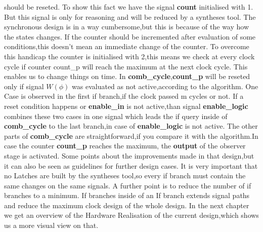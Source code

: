 should be reseted.
To show this fact we have the signal \textbf{count} initialised with 1. But this signal is only for reasoning and will be reduced by a syntheses tool.  
The synchronous design is in a way cumbersome,but this is because of the way how the states changes.
If the counter should be incremented after evaluation of some conditions,this doesn't mean an immediate change of the counter.
To overcome this handicap the counter is initialised with 2,this means we check at every clock cycle if counter count\_p will reach the maximum
at the next clock cycle. This enables us to change things on time. 
In \textbf{comb\_cycle},\textbf{count\_p} will be reseted only if signal $W(\phi)$ was evaluated as not active,according to the algorithm.
One Case is observed in the first if branch,if the clock passed m cycles or not. If a reset condition happens or \textbf{enable\_in}
is not active,than signal \textbf{enable\_logic} combines these two cases in one signal which leads the if query inside of \textbf{comb\_cycle} to the last branch,in case of \textbf{enable\_logic}
is not active. The other parts of \textbf{comb\_cycle} are straightforward,if you compare it with the algorithm.In case the counter \textbf{count\_p} reaches the maximum,
the  \textbf{output} of the observer stage is activated.\newline
Some points about the improvements made in that design,but it can also be seen as guidelines for further design cases.
It is very important that no Latches are built by the syntheses tool,so every if branch must contain the same changes on the same signals.
A further point is to reduce the number of if branches to a minimum. If branches inside of an If branch extends signal paths and reduce the maximum clock design of the whole design.
\newline
In the next chapter we get an overview of the Hardware Realisation of the current design,which shows us a more visual view on that.
